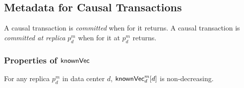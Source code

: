 
\subsection{Metadata for Causal Transactions}
\label{ss:metadata-causal}

A causal transaction is \emph{committed} when \commitcausal{} for it returns.
A causal transaction is \emph{committed at replica} $p^{m}_{d}$
when \commit{} for it at $p^{m}_{d}$ returns.
\subsubsection{Properties of ${\sf knownVec}$}
\label{sss:knownvc}

\begin{applemma} \label{lemma:knownvc-d-nondecreasing}
  For any replica $p^{m}_{d}$ in data center $d$,
  ${\sf knownVec}^{m}_{d}[d]$ is non-decreasing.
\end{applemma}

